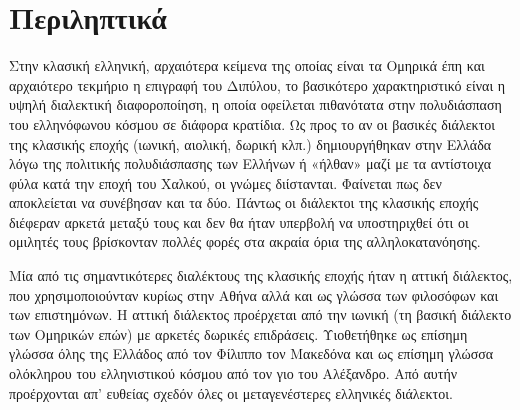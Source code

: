 \section{Περιληπτικά}

Στην κλασική ελληνική, αρχαιότερα κείμενα της οποίας είναι τα Ομηρικά έπη και αρχαιότερο τεκμήριο η επιγραφή του Διπύλου, το βασικότερο χαρακτηριστικό είναι η υψηλή διαλεκτική διαφοροποίηση, η οποία οφείλεται πιθανότατα στην πολυδιάσπαση του ελληνόφωνου κόσμου σε διάφορα κρατίδια. Ως προς το αν οι βασικές διάλεκτοι της κλασικής εποχής (ιωνική, αιολική, δωρική κλπ.) δημιουργήθηκαν στην Ελλάδα λόγω της πολιτικής πολυδιάσπασης των Ελλήνων ή «ήλθαν» μαζί με τα αντίστοιχα φύλα κατά την εποχή του Χαλκού, οι γνώμες διίστανται. Φαίνεται πως δεν αποκλείεται να συνέβησαν και τα δύο. Πάντως οι διάλεκτοι της κλασικής εποχής διέφεραν αρκετά μεταξύ τους και δεν θα ήταν υπερβολή να υποστηριχθεί ότι οι ομιλητές τους βρίσκονταν πολλές φορές στα ακραία όρια της αλληλοκατανόησης.

Μία από τις σημαντικότερες διαλέκτους της κλασικής εποχής ήταν η αττική διάλεκτος, που χρησιμοποιούνταν κυρίως στην Αθήνα αλλά και ως γλώσσα των φιλοσόφων και των επιστημόνων. Η αττική διάλεκτος προέρχεται από την ιωνική (τη βασική διάλεκτο των Ομηρικών επών) με αρκετές δωρικές επιδράσεις. Υιοθετήθηκε ως επίσημη γλώσσα όλης της Ελλάδος από τον Φίλιππο τον Μακεδόνα και ως επίσημη γλώσσα ολόκληρου του ελληνιστικού κόσμου από τον γιο του Αλέξανδρο. Από αυτήν προέρχονται απ' ευθείας σχεδόν όλες οι μεταγενέστερες ελληνικές διάλεκτοι.


